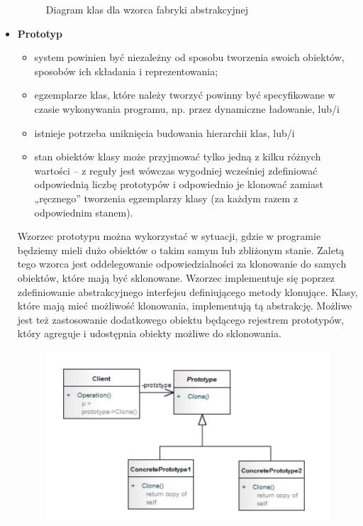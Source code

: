 \documentclass[a4paper,12pt,oneside]{book}
\begin{document}
\begin{itemize}
\begin{figure}[h]
                        \caption{Diagram klas dla wzorca fabryki abstrakcyjnej}
                        \label{fig:twojastara6}
                    \end{figure}
                    \item \textbf{Prototyp} 
                    \begin{itemize}
                        \item system powinien być niezależny od sposobu tworzenia swoich obiektów, 
                        sposobów ich składania i reprezentowania;
                        \item egzemplarze klas, które należy tworzyć powinny być specyfikowane w 
                        czasie wykonywania programu, np. przez dynamiczne ładowanie, lub/i
                        \item istnieje potrzeba uniknięcia budowania hierarchii klas, lub/i
                        \item stan obiektów klasy może przyjmować tylko jedną z kilku różnych wartości 
                        – z reguły jest wówczas wygodniej wcześniej zdefiniować odpowiednią 
                        liczbę prototypów i odpowiednio je klonować zamiast „ręcznego” tworzenia 
                        egzemplarzy klasy (za każdym razem z odpowiednim stanem).
                    \end{itemize}
                    Wzorzec prototypu można wykorzystać w sytuacji, gdzie w programie będziemy mieli dużo obiektów o takim samym lub zbliżonym stanie. Zaletą tego wzorca jest oddelegowanie odpowiedzialności za klonowanie do samych obiektów, które mają być sklonowane. Wzorzec implementuje się poprzez zdefiniowanie abstrakcyjnego interfejsu definiującego metody klonujące. Klasy, które mają mieć możliwość klonowania, implementują tą abstrakcję. Możliwe jest też zastosowanie dodatkowego obiektu będącego rejestrem prototypów, który agreguje i udostępnia obiekty możliwe do sklonowania.
                    \begin{figure}[h]
                        \centering
                        \includegraphics[width=\textwidth/2]{images/prototype.jpg}

\end{figure}
\end{itemize}
\end{document}
